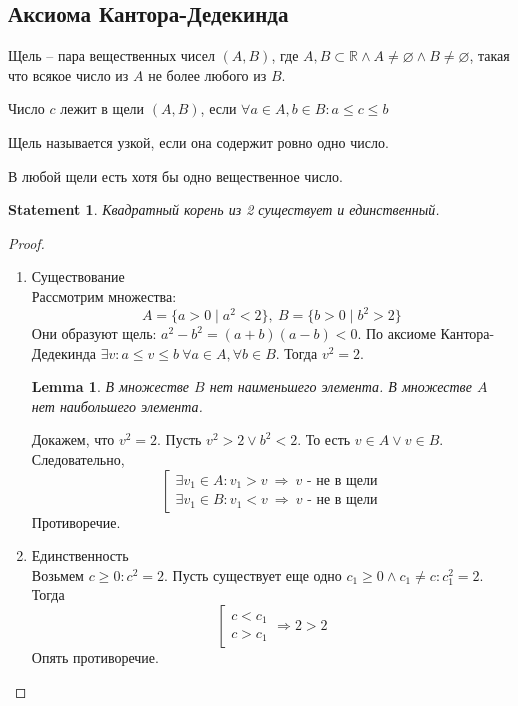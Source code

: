 \documentclass[11pt]{book}
\newcommand{\R}{\mathbb{R}}
\renewcommand{\le}{\leqslant}
\renewcommand{\ge}{\geqslant}
\theoremstyle{definition}
\theoremstyle{plain}
\theoremstyle{plain}
\newtheorem*{lm}{Lemma}
\newtheorem*{st}{Statement}
\theoremstyle{definition}
\theoremstyle{remark}
\begin{document}
\subsection{Аксиома Кантора-Дедекинда}\label{ques_4}
\begin{defn}
    Щель -- пара вещественных чисел $(A, B)$, где  $A, B \subset \R \wedge A \ne \varnothing \wedge B \ne \varnothing$, такая что всякое число из $A$ не более любого из $B$.
\end{defn}
\begin{defn}
    Число $c$ лежит в щели $(A, B) $, если $\forall a \in A, b \in B: a \le c \le b$
\end{defn}
\begin{defn}
    Щель называется узкой, если она содержит ровно одно число.
\end{defn}
\begin{aks}
    В любой щели есть хотя бы одно вещественное число.
\end{aks}
\begin{st}
    Квадратный корень из 2 существует и единственный.
\end{st}
\begin{proof}
    $ $
    \begin{enumerate}
        \item Существование \\
	    Рассмотрим множества:
	    $$A = \{a > 0 \mid a^2 < 2\}, ~ B = \{b > 0\mid b^2 > 2\}$$
	    Они образуют щель: $a^2 - b^2 = (a + b)(a - b) < 0$. По аксиоме Кантора-Дедекинда $\exists v: a \le v \le b ~\forall a \in A, \forall b \in B$. Тогда $v^2 = 2$.
	    \begin{lm}
	        В множестве $ B$ нет наименьшего элемента.
	        В множестве $ A$ нет наибольшего элемента.
	    \end{lm}
	    Докажем, что $v^2 = 2$. Пусть $v^2 > 2 \vee b^2<2$. То есть $v \in A \vee v \in B$. Следовательно, \[
	    \left [ 
	    \begin{array}{l}
	    \exists v_1 \in A : v_1 > v ~ \Rightarrow ~ v \mbox{ - не в щели}\\ 
	    \exists v_1 \in B : v_1 < v ~ \Rightarrow ~ v \mbox{ - не в щели}
	    \end{array}
	    \right 
	    .\] 
Противоречие.
	\item Единственность \\
	    Возьмем $c \ge 0: c^2 = 2$. Пусть существует еще одно $c_1 \ge 0 \wedge c_1 \ne c: c_1^2 = 2$. Тогда \[
	    \left [ 
	    \begin{array}{c}
	   c<c_1 \\
	   c>c_1
	    \end{array}
	    \right . \Rightarrow 2 > 2
	\] 
	    Опять противоречие.
    \end{enumerate}
\end{proof}
\end{document}
